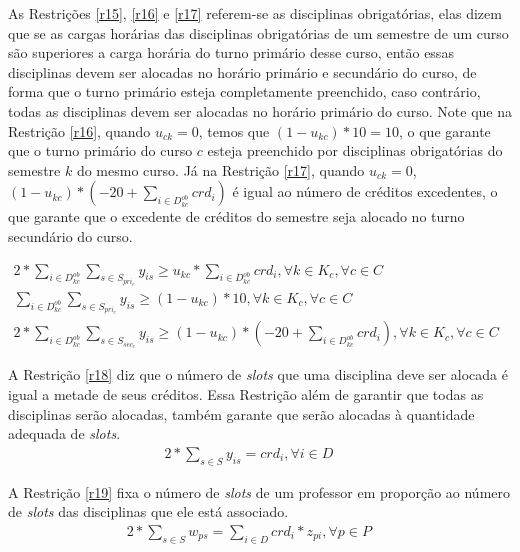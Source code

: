 As Restrições \ref{r15}, \ref{r16} e \ref{r17} referem-se as disciplinas obrigatórias, elas dizem que se as cargas horárias das disciplinas obrigatórias de um semestre de um curso são superiores a carga horária do turno primário desse curso, então essas disciplinas devem ser alocadas no horário primário e secundário do curso, de forma que o turno primário esteja completamente preenchido, caso contrário, todas as disciplinas devem ser alocadas no horário primário do curso. Note que na Restrição \ref{r16}, quando $u_{ck} = 0$, temos que $(1 - u_{kc}) * 10 = 10$, o que garante que o turno primário do curso $c$ esteja preenchido por disciplinas obrigatórias do semestre $k$ do mesmo curso. Já na Restrição \ref{r17}, quando $u_{ck} = 0$, $(1 - u_{kc}) * (-20+\sum_{i \in{D_{kc}^{ob}}}^{}{crd_i})$ é igual ao número de créditos excedentes, o que garante que o excedente de créditos do semestre seja alocado no turno secundário do curso.
 
\begin{eqnarray}
\label{r15}
2*\sum_{i \in{D_{kc}^{ob}}}^{}{\sum_{s\in{S_{pri_c}}}^{}{y_{is}}}\geq u_{kc} * \sum_{i \in{D_{kc}^{ob}}}^{}{crd_i}, \forall{k}\in{K_c}, \forall{c}\in{C}  &&\\
\label{r16}
\sum_{i \in{D_{kc}^{ob}}}^{}{\sum_{s \in{S_{pri_c}}}^{}{y_{is}}} \geq (1 - u_{kc}) * 10, \forall{k}\in{K_c}, \forall{c}\in{C}  &&\\
\label{r17}
2*\sum_{i \in{D_{kc}^{ob}}}^{}{\sum_{s \in{S_{sec_c}}}^{}{y_{is}}}\geq (1 - u_{kc}) * (-20+\sum_{i \in{D_{kc}^{ob}}}^{}{crd_i}),\forall{k}\in{K_c}, \forall{c}\in{C}&&
\end{eqnarray}

A Restrição \ref{r18} diz que o número de \textit{slots} que uma disciplina deve ser alocada é igual a metade de seus créditos. Essa Restrição além de garantir que todas as disciplinas serão alocadas, também garante que serão alocadas à quantidade adequada de \textit{slots}.
\begin{eqnarray}
\label{r18}
2*\sum_{s \in S}^{}{y_{is}} = crd_i, \forall{i}\in{D}  &&
\end{eqnarray}

A Restrição \ref{r19} fixa o número de \textit{slots} de um professor em proporção ao número de \textit{slots} das disciplinas que ele está associado.
\begin{eqnarray}
\label{r19}
2 * \sum_{s \in S}^{}{w_{ps}} = \sum_{i \in D}^{}{crd_i * z_{pi}}, \forall{p}\in{P} &&
\end{eqnarray}

